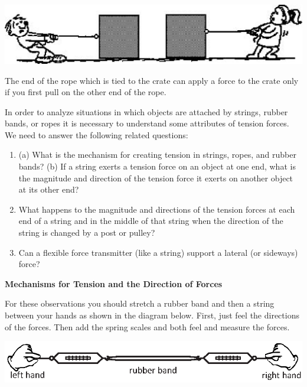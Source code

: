 \vspace{0.5cm}
{\par\centering \includegraphics[width=\textwidth]{newton/newton_fig3.eps} \par}
\answerspace{0.5cm}

The end of the rope which is tied to the crate can apply a force to the crate
only if you first pull on the other end of the rope.  

In order
to analyze situations in which objects are attached by strings, rubber bands,
or ropes it is necessary to understand some attributes of tension forces. We
need to answer the following related questions:

\begin{enumerate}
\item (a) What is the mechanism for creating tension in strings, ropes, and rubber
bands? (b) If a string exerts a tension force on an object at one end, what
is the magnitude and direction of the tension force it exerts on another object
at its other end?
\item What happens to the magnitude and directions of the tension forces at each end
of a string and in the middle of that string when the direction of the string
is changed by a post or pulley?
\item Can a flexible force transmitter (like a string) support a lateral (or sideways)
force?
\end{enumerate}

\pagebreak[3]
\textbf{Mechanisms for Tension and the Direction of Forces }

For these observations you should stretch a rubber band and then a string between
your hands as shown in the diagram below. First, just feel the directions of
the forces. Then add the spring scales and both feel and measure the forces.

\vspace{0.3cm}
{\par\centering \includegraphics{newton/hands_plus_scales.eps} \par}
\vspace{0.3cm}

